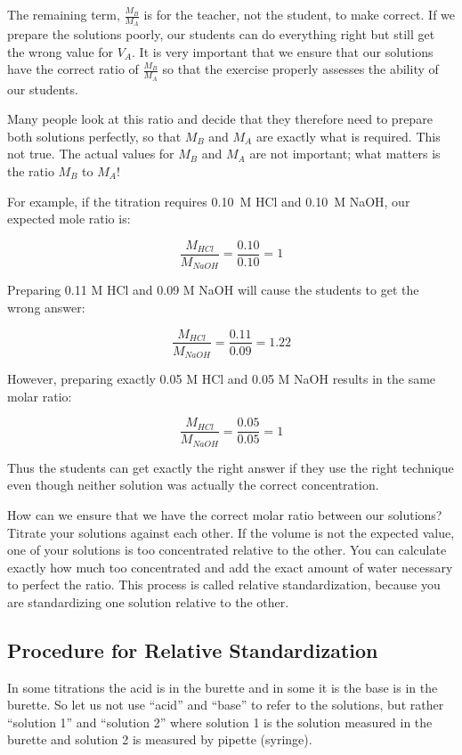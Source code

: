The remaining term, $ \frac{M_{B}}{M_{A}} $ is for the teacher, not the student, to make correct. If we prepare the solutions poorly, our students can do everything right but still get the wrong value for $ V_{A} $. It is very important that we ensure that our solutions have the correct ratio of $ \frac{M_{B}}{M_{A}} $ so that the exercise properly assesses the ability of our students.

Many people look at this ratio and decide that they therefore need to prepare both solutions perfectly, so that $ M_{B} $ and $ M_{A} $ are exactly what is required. This not true. The actual values for $ M_{B} $ and $ M_{A} $ are not important; what matters is the ratio $ M_{B} $ to $ M_{A} $!

For example, if the titration requires 0.10~M HCl and 0.10~M NaOH, our expected mole ratio is:

\[ \frac{M_{HCl}}{M_{NaOH}} = \frac{0.10}{0.10} = 1 \]

Preparing 0.11 M HCl and 0.09 M NaOH will cause the students to get the wrong answer:

\[ \frac{M_{HCl}}{M_{NaOH}} = \frac{0.11}{0.09} = 1.22 \]

However, preparing exactly 0.05 M HCl and 0.05 M NaOH results in the same molar ratio:

\[ \frac{M_{HCl}}{M_{NaOH}} = \frac{0.05}{0.05} = 1 \]

Thus the students can get exactly the right answer if they use the right technique even though neither solution was actually the correct concentration.

How can we ensure that we have the correct molar ratio between our solutions? Titrate your solutions against each other. If the volume is not the expected value, one of your solutions is too concentrated relative to the other. You can calculate exactly how much too concentrated and add the exact amount of water necessary to perfect the ratio. This process is called relative standardization, because you are standardizing one solution relative to the other.

\subsection{Procedure for Relative Standardization}
\label{sub:relstand}
In some titrations the acid is in the burette and in some it is the base is in the burette. So let us not use ``acid'' and ``base'' to refer to the solutions, but rather ``solution 1'' and ``solution 2'' where solution 1 is the solution measured in the burette and solution 2 is measured by pipette (syringe).

